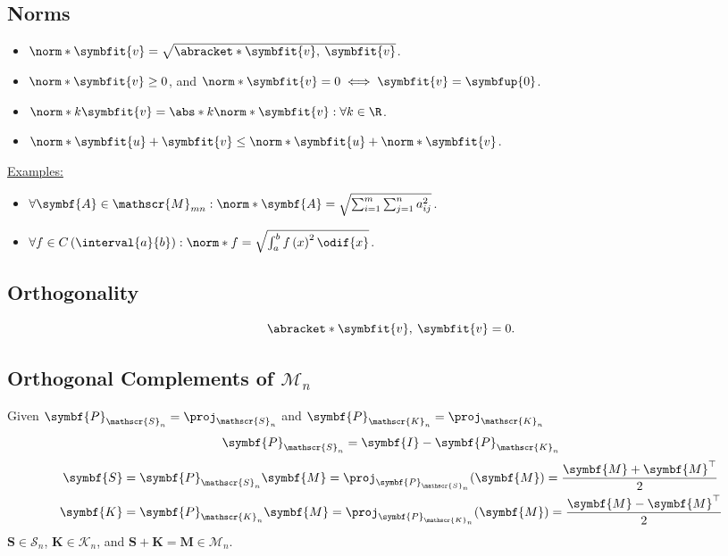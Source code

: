 \documentclass{article}
\begin{document}
\begin{multicols*}{3}
    \subsection{Norms}
    \begin{itemize}
        \item \(\norm*{\symbfit{v}} = \sqrt{\abracket*{\symbfit{v},\: \symbfit{v}}}\).
        \item \(\norm*{\symbfit{v}} \geq 0\), and \(\norm*{\symbfit{v}} = 0 \iff \symbfit{v} = \symbfup{0}\).
        \item \(\norm*{k \symbfit{v}} = \abs*{k} \norm*{\symbfit{v}} : \forall k \in \R\).
        \item \(\norm*{\symbfit{u} + \symbfit{v}} \leq \norm*{\symbfit{u}} + \norm*{\symbfit{v}}\).
    \end{itemize}
    \underline{Examples:}
    \begin{itemize}
        \item \(\forall \symbf{A} \in \mathscr{M}_{mn} : \norm*{\symbf{A}} = \sqrt{\sum_{i = 1}^m \sum_{j = 1}^n a_{ij}^2}\).
        \item \(\forall f \in C\left( \interval{a}{b} \right) : \norm*{f} = \sqrt{\int_a^b f\left( x \right)^2 \odif{x}}\).
    \end{itemize}
    \subsection{Orthogonality}
    \begin{equation*}
        \abracket*{\symbfit{v},\: \symbfit{v}} = 0.
    \end{equation*}
    \subsection{Orthogonal Complements of \texorpdfstring{\(\mathscr{M}_{n}\)}{Mn}}
    Given \(\symbf{P}_{\mathscr{S}_n} = \proj_{\mathscr{S}_n}\) and
    \(\symbf{P}_{\mathscr{K}_n} = \proj_{\mathscr{K}_n}\)
    \begin{equation*}
        \symbf{P}_{\mathscr{S}_n} = \symbf{I} - \symbf{P}_{\mathscr{K}_n}                                                                                                    \\
    \end{equation*}
    \begin{align*}
        \symbf{S} & = \symbf{P}_{\mathscr{S}_n} \symbf{M} = \proj_{\symbf{P}_{\mathscr{S}_n}}{\left( \symbf{M} \right)} = \frac{\symbf{M} + \symbf{M}^\top}{2} \\
        \symbf{K} & = \symbf{P}_{\mathscr{K}_n} \symbf{M} = \proj_{\symbf{P}_{\mathscr{K}_n}}{\left( \symbf{M} \right)} = \frac{\symbf{M} - \symbf{M}^\top}{2}
    \end{align*}
    \(\symbf{S} \in \mathscr{S}_n\), \(\symbf{K} \in \mathscr{K}_n\), and \(\symbf{S} + \symbf{K} = \symbf{M} \in \mathscr{M}_n\).

\end{multicols*}
\end{document}
